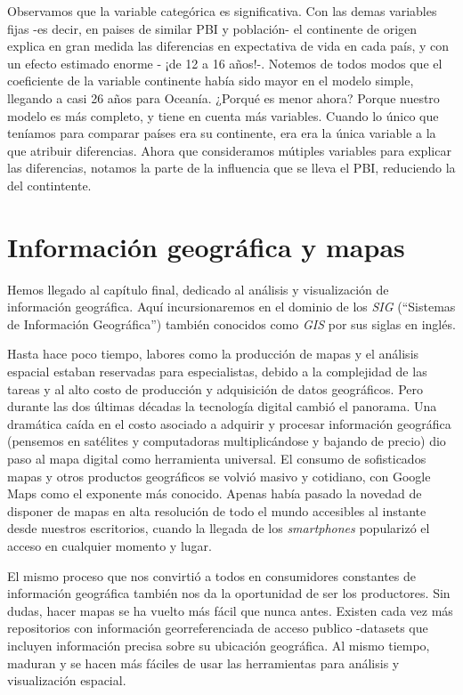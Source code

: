 \documentclass[]{book}
\begin{document}
Observamos que la variable categórica es significativa. Con las demas
variables fijas -es decir, en paises de similar PBI y población- el
continente de origen explica en gran medida las diferencias en
expectativa de vida en cada país, y con un efecto estimado enorme - ¡de
12 a 16 años!-. Notemos de todos modos que el coeficiente de la variable
continente había sido mayor en el modelo simple, llegando a casi 26 años
para Oceanía. ¿Porqué es menor ahora? Porque nuestro modelo es más
completo, y tiene en cuenta más variables. Cuando lo único que teníamos
para comparar países era su continente, era era la única variable a la
que atribuir diferencias. Ahora que consideramos mútiples variables para
explicar las diferencias, notamos la parte de la influencia que se lleva
el PBI, reduciendo la del contintente.

\chapter{Información geográfica y
mapas}\label{informacion-geografica-y-mapas}

Hemos llegado al capítulo final, dedicado al análisis y visualización de
información geográfica. Aquí incursionaremos en el dominio de los
\emph{SIG} (``Sistemas de Información Geográfica'') también conocidos
como \emph{GIS} por sus siglas en inglés.

Hasta hace poco tiempo, labores como la producción de mapas y el
análisis espacial estaban reservadas para especialistas, debido a la
complejidad de las tareas y al alto costo de producción y adquisición de
datos geográficos. Pero durante las dos últimas décadas la tecnología
digital cambió el panorama. Una dramática caída en el costo asociado a
adquirir y procesar información geográfica (pensemos en satélites y
computadoras multiplicándose y bajando de precio) dio paso al mapa
digital como herramienta universal. El consumo de sofisticados mapas y
otros productos geográficos se volvió masivo y cotidiano, con Google
Maps como el exponente más conocido. Apenas había pasado la novedad de
disponer de mapas en alta resolución de todo el mundo accesibles al
instante desde nuestros escritorios, cuando la llegada de los
\emph{smartphones} popularizó el acceso en cualquier momento y lugar.

El mismo proceso que nos convirtió a todos en consumidores constantes de
información geográfica también nos da la oportunidad de ser los
productores. Sin dudas, hacer mapas se ha vuelto más fácil que nunca
antes. Existen cada vez más repositorios con información
georreferenciada de acceso publico -datasets que incluyen información
precisa sobre su ubicación geográfica. Al mismo tiempo, maduran y se
hacen más fáciles de usar las herramientas para análisis y visualización
espacial.
\end{document}
